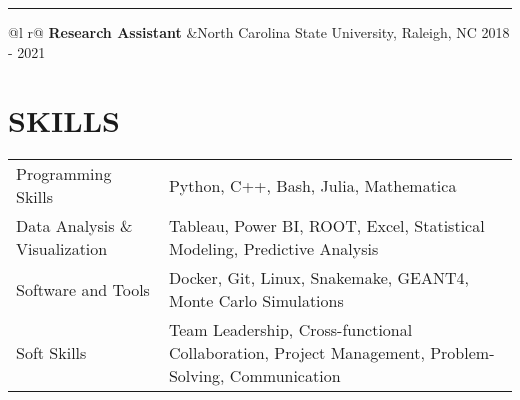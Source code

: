 \documentclass[a4paper,12pt]{article}
\begin{document}
\hrule
\begin{tabularx}{\linewidth}{ @{}l r@{} }
\textbf{Research Assistant} &North Carolina State University, Raleigh, NC \hfill 2018 - 2021 \\[3pt]
\end{tabularx}

\section{\textbf{SKILLS}}
\begin{tabularx}{\linewidth}{@{}l X@{}}
Programming Skills &  \normalsize{Python, C++, Bash, Julia, Mathematica}\\
Data Analysis \& Visualization & \normalsize{Tableau, Power BI, ROOT, Excel, Statistical Modeling, Predictive Analysis}\\
Software and Tools & \normalsize{Docker, Git, Linux, Snakemake, GEANT4, Monte Carlo Simulations}\\
Soft Skills  &  \normalsize{Team Leadership, Cross-functional Collaboration, Project Management, Problem-Solving, Communication}

\end{tabularx}
\end{document}
